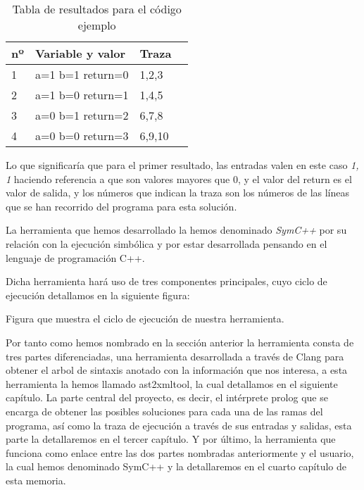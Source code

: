 \begin{table}
\begin{center}
\begin{tabular}{| l | l | l | l ||}
\hline
nº & Variable y valor & Traza \\
\hline
1 & a=1 b=1 return=0 & 1,2,3 \\
\hline
2 & a=1 b=0 return=1 & 1,4,5 \\
\hline
3 & a=0 b=1 return=2 & 6,7,8 \\
\hline
4 & a=0 b=0 return=3 & 6,9,10 \\
\hline
\end{tabular}
\end{center}
\caption{Tabla de resultados para el c\'odigo ejemplo}
\end{table}

Lo que significar\'ia que para el primer resultado, las entradas valen en este caso {\it 1, 1} haciendo referencia a que son valores mayores que 0, y el valor del return es el valor de salida, y los n\'umeros que indican la traza son los n\'umeros de las l\'ineas que se han recorrido del programa para esta soluci\'on.

La herramienta que hemos desarrollado la hemos denominado {\it SymC++} por su relaci\'on con la ejecuci\'on simb\'olica y por estar desarrollada pensando en el lenguaje de programaci\'on C++.

Dicha herramienta har\'a uso de tres componentes principales, cuyo ciclo de ejecuci\'on detallamos en la siguiente figura:

%
{Figura que muestra el ciclo de ejecuci\'on de nuestra herramienta.}

Por tanto como hemos nombrado en la secci\'on anterior la herramienta consta de tres partes diferenciadas, una herramienta desarrollada a trav\'es de Clang para obtener el arbol de sintaxis anotado con la informaci\'on que nos interesa, a esta herramienta la hemos llamado ast2xmltool, la cual detallamos en el siguiente cap\'itulo. La parte central del proyecto, es decir, el int\'erprete prolog que se encarga de obtener las posibles soluciones para cada una de las ramas del programa, as\'i como la traza de ejecuci\'on a trav\'es de sus entradas y salidas, esta parte la detallaremos en el tercer cap\'itulo. Y por \'ultimo, la herramienta que funciona como enlace entre las dos partes nombradas anteriormente y el usuario, la cual hemos denominado SymC++ y la detallaremos en el cuarto cap\'itulo de esta memoria.



